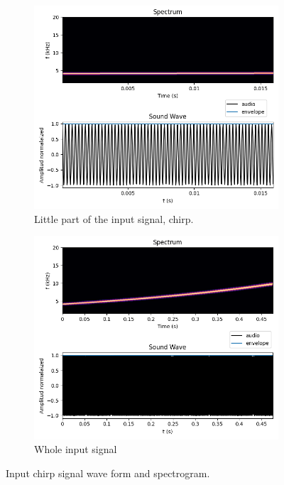 \begin{figure}[H]
     \centering
     \begin{subfigure}[b]{0.48\textwidth}
         \centering
         \includegraphics[width=\textwidth]{Images/part_chirp.png}
         \caption{Little part of the input signal, chirp.}
         \label{fig:part_chirp}
     \end{subfigure}
     \hfill
     \begin{subfigure}[b]{0.48\textwidth}
         \centering
         \includegraphics[width=\textwidth]{Images/whole_chirp.png}
         \caption{Whole input signal}
         \label{fig:whole_chirp}
     \end{subfigure}
     \hfill
        \caption{Input chirp signal wave form and spectrogram.}
        \label{fig:chirp}
\end{figure}


